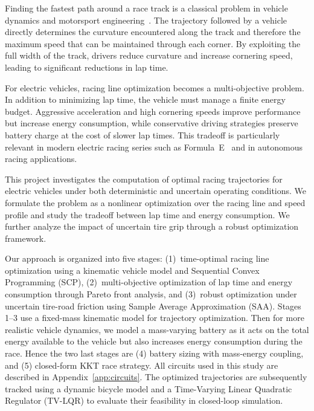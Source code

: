 \documentclass[conf]{new-aiaa}
\begin{document}
Finding the fastest path around a race track is a classical problem in vehicle dynamics and
motorsport engineering~\cite{Xiong2010, Heilmeier2020}. The trajectory followed by a vehicle
directly determines the curvature encountered along the track and therefore the maximum speed that
can be maintained through each corner. By exploiting the full width of the track, drivers reduce
curvature and increase cornering speed, leading to significant reductions in lap time.

For electric vehicles, racing line optimization becomes a multi-objective problem. In addition to
minimizing lap time, the vehicle must manage a finite energy budget. Aggressive acceleration and
high cornering speeds improve performance but increase energy consumption, while conservative
driving strategies preserve battery charge at the cost of slower lap times. This tradeoff is
particularly relevant in modern electric racing series such as Formula~E~\cite{Sciarretta2007} and
in autonomous racing applications.

This project investigates the computation of optimal racing trajectories for electric vehicles
under both deterministic and uncertain operating conditions. We formulate the problem as a
nonlinear optimization over the racing line and speed profile and study the tradeoff between lap
time and energy consumption. We further analyze the impact of uncertain tire grip through a robust
optimization framework.

Our approach is organized into five stages: (1)~time-optimal racing line optimization using a
kinematic vehicle model and Sequential Convex Programming (SCP), (2)~multi-objective optimization
of lap time and energy consumption through Pareto front analysis, and (3)~robust optimization
under uncertain tire-road friction using Sample Average Approximation (SAA). Stages 1--3 use a
fixed-mass kinematic model for trajectory optimization. Then for more realistic vehicle dynamics,
we model a mass-varying battery as it acts on the total energy available to the vehicle but also
increases energy consumption during the race. Hence the two last stages are (4) battery sizing
with mass-energy coupling, and (5) closed-form KKT race strategy. All circuits used in this study
are described in Appendix~\ref{app:circuits}. The optimized trajectories are subsequently tracked
using a dynamic bicycle model and a Time-Varying Linear Quadratic Regulator (TV-LQR) to evaluate
their feasibility in closed-loop simulation.

\end{document}
